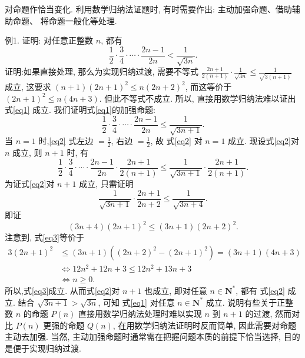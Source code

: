 
对命题作恰当变化.
利用数学归纳法证题时, 有时需要作出: 主动加强命题、借助辅助命题、 将命题一般化等处理.



例1. 证明: 对任意正整数 $n$, 都有
$$
\frac{1}{2} \cdot \frac{3}{4} \cdot \cdots \cdot \frac{2 n-1}{2 n}<\frac{1}{\sqrt{3 n}} . \label{eq1}
$$
证明:如果直接处理, 那么为实现归纳过渡, 需要不等式 $\frac{2 n+1}{2(n+1)} \cdot \frac{1}{\sqrt{3 n}} \leqslant \frac{1}{\sqrt{3(n+1)}}$ 成立, 这要求 $(n+1)(2 n+1)^2 \leqslant n(2 n+2)^2$, 而这等价于 $(2 n+1)^2 \leqslant n(4 n+3)$. 但此不等式不成立.
所以, 直接用数学归纳法难以证出 式\ref{eq1} 成立.
我们证明式\ref{eq1}的加强命题:
$$
\frac{1}{2} \cdot \frac{3}{4} \cdot \cdots \cdot \frac{2 n-1}{2 n} \leqslant \frac{1}{\sqrt{3 n+1}} . \label{eq2}
$$
当 $n=1$ 时,\ref{eq2} 式左边 $=\frac{1}{2}$, 右边 $=\frac{1}{2}$, 故 式\ref{eq2} 对 $n=1$ 成立.
现设式\ref{eq2}对 $n$ 成立, 则 $n+1$ 时, 有
$$
\frac{1}{2} \cdot \frac{3}{4} \cdot \cdots \cdot \frac{2 n-1}{2 n} \cdot \frac{2 n+1}{2(n+1)} \leqslant \frac{1}{\sqrt{3 n+1}} \cdot \frac{2 n+1}{2(n+1)} .
$$
为证式\ref{eq2}对 $n+1$ 成立, 只需证明
$$
\frac{1}{\sqrt{3 n+1}} \cdot \frac{2 n+1}{2 n+2} \leqslant \frac{1}{\sqrt{3 n+4}} .
$$
即证
$$
(3 n+4)(2 n+1)^2 \leqslant(3 n+1)(2 n+2)^2 . \label{eq3}
$$
注意到, 式\ref{eq3}等价于
$$
\begin{aligned}
3(2 n+1)^2 & \leqslant(3 n+1)\left((2 n+2)^2-(2 n+1)^2\right)=(3 n+1)(4 n+3) \\
& \Leftrightarrow 12 n^2+12 n+3 \leqslant 12 n^2+13 n+3 \\
& \Leftrightarrow n \geqslant 0 .
\end{aligned}
$$
所以,式\ref{eq3}成立.
从而式\ref{eq2}对 $n+1$ 也成立, 即对任意 $n \in \mathbf{N}^*$, 都有 式\ref{eq2} 成立.
结合 $\sqrt{3 n+1}>\sqrt{3 n}$, 可知 式\ref{eq1} 对任意 $n \in \mathbf{N}^*$ 成立.
说明有些关于正整数 $n$ 的命题 $P(n)$ 直接用数学归纳法处理时难以实现 $n$ 到 $n+1$ 的过渡, 然而对比 $P(n)$ 更强的命题 $Q(n)$, 在用数学归纳法证明时反而简单, 因此需要对命题主动去加强.
当然, 主动加强命题时通常需在把握问题本质的前提下恰当选择, 目的是便于实现归纳过渡.




